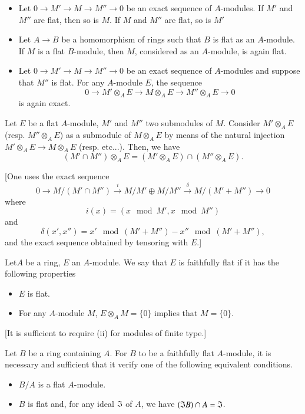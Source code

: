 \begin{proposition}\label{chap3-prop4.4}
\begin{itemize}
\item[\rm(i)] Let $0\to M'\to M\to M''\to 0$ be an exact sequence of $A$-modules. If $M'$ and $M''$ are flat, then so is $M$. If $M$ and $M''$ are flat, so is $M'$

\item[\rm(ii)] Let $A\to B$ be a homomorphism of rings such that $B$ is flat as an $A$-module. If $M$ is a flat $B$-module, then $M$, considered as an $A$-module, is again flat.

\item[\rm(iii)] Let $0\to M'\to M\to M''\to 0$ be an exact sequence of $A$-modules and suppose that $M''$ is flat. For any $A$-module $E$, the sequence
$$
0\to M'\otimes_{A}E\to M\otimes_{A}E\to M''\otimes_{A}E\to 0
$$
is again exact.
\end{itemize}
\end{proposition}

\begin{proposition}\label{chap3-prop4.5}
Let $E$ be a flat $A$-module, $M'$ and $M''$ two submodules of $M$. Consider $M'\otimes_{A}E$ (resp. $M''\otimes_{A}E$) as a submodule of $M\otimes_{A}E$ by means of the natural injection $M'\otimes_{A}E\to M\otimes_{A}E$ (resp. etc...). Then, we have
$$
(M'\cap M'')\otimes_{A}E=(M'\otimes_{A}E)\cap (M''\otimes_{A}E).
$$
\end{proposition}
[One uses the exact sequence
$$
0\to M/(M'\cap M'')\xrightarrow{i}M/M'\oplus M/M''\xrightarrow{\delta}M/(M'+M'')\to 0
$$
where
$$
i(x)=(x\mod M',x\mod M'')
$$
and
$$
\delta(x',x'')=x'\mod (M'+M'')-x''\mod (M'+M''),
$$
and the exact sequence obtained by tensoring with $E$.]

\begin{definition}\label{chap3-defi4.6}
Let\pageoriginale $A$ be a ring, $E$ an $A$-module. We say that $E$ is faithfully flat if it has the following properties
\begin{itemize}
\item[\rm(i)] $E$ is flat.

\item[\rm(ii)] For any $A$-module $M$, $E\otimes_A M=\{0\}$ implies that $M=\{0\}$.
\end{itemize}
\end{definition}
[It is sufficient to require (ii) for modules of finite type.]

Let $B$ be a ring containing $A$. For $B$ to be a faithfully flat $A$-module, it is necessary and sufficient that it verify one of the following equivalent conditions.
\begin{itemize}
\item[(i)] $B/A$ is a flat $A$-module.

\item[(ii)] $B$ is flat and, for any ideal $\mathfrak{I}$ of $A$, we have $(\mathfrak{I} B)\cap A=\mathfrak{I}$.
\end{itemize}

